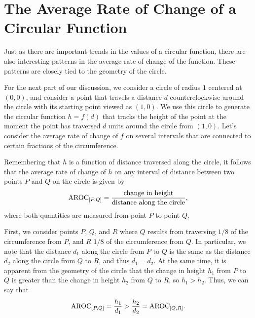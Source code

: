 \documentclass[nooutcomes, noauthor]{ximera}
\begin{document}


\section{The Average Rate of Change of a Circular Function}

Just as there are important trends in the values of a circular function, there are also interesting patterns in the average rate of change of the function.  These patterns are closely tied to the geometry of the circle.%

For the next part of our discussion, we consider a circle of radius \(1\) centered at \((0,0)\), and consider a point that travels a distance \(d\) counterclockwise around the circle with its starting point viewed as \((1,0)\).  We use this circle to generate the circular function \(h = f(d)\) that tracks the height of the point at the moment the point has traversed \(d\) units around the circle from \((1,0)\).  Let's consider the average rate of change of \(f\) on several intervals that are connected to certain fractions of the circumference.%

Remembering that \(h\) is a function of distance traversed along the circle, it follows that the average rate of change of \(h\) on any interval of distance between two points \(P\) and \(Q\) on the circle is given by%
\begin{equation*}
\mathrm{AROC}_{[P,Q]} = \frac{\text{change in height}}{\text{distance along the circle}}\text{,}
\end{equation*}
where both quantities are measured from point \(P\) to point \(Q\).%


First, we consider points \(P\), \(Q\), and \(R\) where \(Q\) results from traversing \(1/8\) of the circumference from \(P\), and \(R\) \(1/8\) of the circumference from \(Q\).  In particular, we note that the distance \(d_1\) along the circle from \(P\) to \(Q\) is the same as the distance \(d_2\) along the circle from \(Q\) to \(R\), and thus \(d_1 = d_2\).  At the same time, it is apparent from the geometry of the circle that the change in height \(h_1\) from \(P\) to \(Q\) is greater than the change in height \(h_2\) from \(Q\) to \(R\), so \(h_1 \gt h_2\).  Thus, we can say that%
\begin{equation*}
\mathrm{AROC}_{[P,Q]} = \frac{h_1}{d_1} > \frac{h_2}{d_2} = \mathrm{AROC}_{[Q,R]} \text{.}
\end{equation*}
\end{document}
